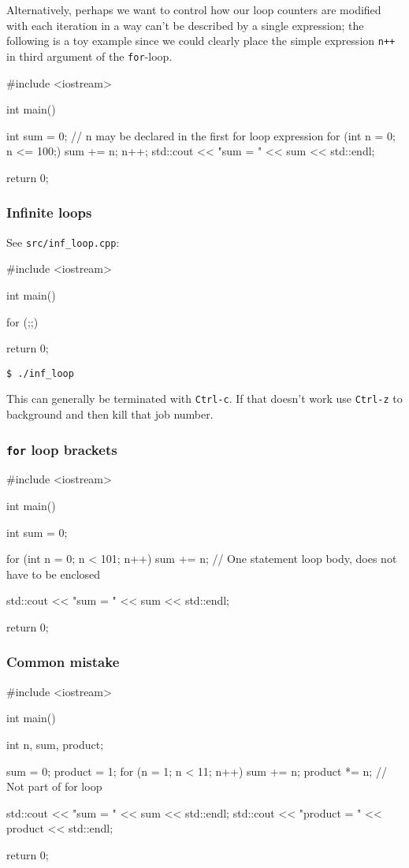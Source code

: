 \documentclass[12pt,letterpaper,twoside]{article}
\begin{document}
Alternatively, perhaps we want to control how our loop counters are
modified with each iteration in a way can't be described by a single
expression; the following is a toy example since we could clearly
place the simple expression \texttt{n++} in third argument of the \texttt{for}-loop.
\begin{cpp}
#include <iostream>

int main() {
  int sum = 0;
  // n may be declared in the first for loop expression
  for (int n = 0; n <= 100;) {
    sum += n;
    n++;
  }
  std::cout << "sum = " << sum << std::endl;

  return 0;
}
\end{cpp}

\subsubsection{Infinite loops}
See \texttt{src/inf\_loop.cpp}:

\begin{cpp}
#include <iostream>

int main() {
  for (;;) {
  }

  return 0;
}
\end{cpp}

\begin{verbatim}
$ ./inf_loop
\end{verbatim}
This can generally be terminated with \texttt{Ctrl-c}.
If that doesn't work use \texttt{Ctrl-z} to background and then kill
that job number.

\subsubsection{\texorpdfstring{\texttt{for} loop brackets}{for loop brackets}}
\begin{cpp}
#include <iostream>

int main() {
  int sum = 0;

  for (int n = 0; n < 101; n++)
    sum += n; // One statement loop body, does not have to be enclosed

  std::cout << "sum = " << sum << std::endl;

  return 0;
}
\end{cpp}

\subsubsection{Common mistake}
\begin{cpp}
#include <iostream>

int main() {
  int n, sum, product;

  sum = 0;
  product = 1;
  for (n = 1; n < 11; n++)
    sum += n;
    product *= n; // Not part of for loop


  std::cout << "sum = " << sum << std::endl;
  std::cout << "product = " << product << std::endl;

  return 0;
}
\end{cpp}
\end{document}
